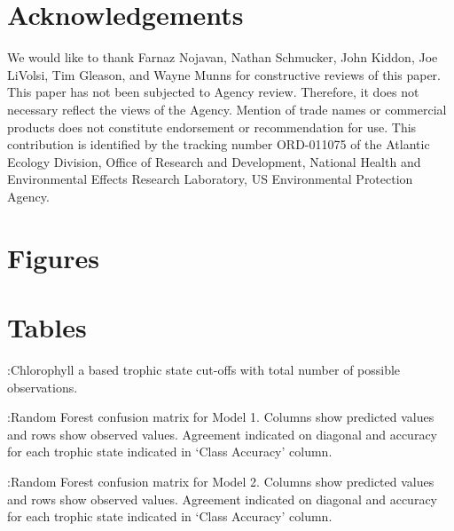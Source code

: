 \documentclass[11pt,]{article}
\begin{document}
\section{Acknowledgements}\label{acknowledgements}

We would like to thank Farnaz Nojavan, Nathan Schmucker, John Kiddon,
Joe LiVolsi, Tim Gleason, and Wayne Munns for constructive reviews of
this paper. This paper has not been subjected to Agency review.
Therefore, it does not necessary reflect the views of the Agency.
Mention of trade names or commercial products does not constitute
endorsement or recommendation for use. This contribution is identified
by the tracking number ORD-011075 of the Atlantic Ecology Division,
Office of Research and Development, National Health and Environmental
Effects Research Laboratory, US Environmental Protection Agency.

\newpage

\section{Figures}\label{figures}

\newpage

\newpage

\newpage

\newpage

\newpage

\newpage

\newpage

\newpage

\newpage

\newpage

\newpage

\newpage

\section{Tables}\label{tables}

:Chlorophyll a based trophic state cut-offs with total number of
possible observations.\label{tab:trophicStateTable}

\newpage

:Random Forest confusion matrix for Model 1. Columns show predicted
values and rows show observed values. Agreement indicated on diagonal
and accuracy for each trophic state indicated in `Class Accuracy'
column. \label{tab:Confusion_Model1}

\newpage

:Random Forest confusion matrix for Model 2. Columns show predicted
values and rows show observed values. Agreement indicated on diagonal
and accuracy for each trophic state indicated in `Class Accuracy'
column. \label{tab:Confusion_Model2}
\end{document}

